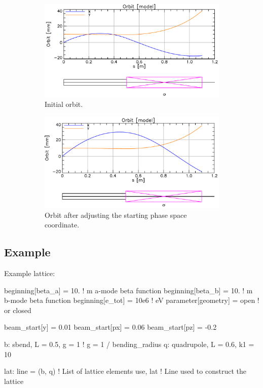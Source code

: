 \documentclass{hitec}
\begin{document}
\begin{figure}[tb]
  \centering
  \begin{subfigure}[b]{0.48\textwidth}
    \includegraphics[width=\textwidth]{phase0.pdf}
    \caption{Initial orbit.}
    \label{f:phase0}
  \end{subfigure}
  \hfil
  \begin{subfigure}[b]{0.48\textwidth}
    \includegraphics[width=\textwidth]{phase1.pdf}
    \caption{Orbit after adjusting the starting  phase space coordinate.}
    \label{f:phase1}
  \end{subfigure}
  \caption{}
\end{figure}

\subsection{Example}

Example lattice:
{\small
\begin{code}
beginning[beta_a] = 10.     ! m  a-mode beta function
beginning[beta_b] = 10.     ! m  b-mode beta function
beginning[e_tot] = 10e6     ! eV
parameter[geometry] = open  ! or closed

beam_start[y] = 0.01
beam_start[px] = 0.06
beam_start[pz] = -0.2

b: sbend, L = 0.5, g = 1    ! g = 1 / bending_radius
q: quadrupole, L = 0.6, k1 = 10

lat: line = (b, q)      ! List of lattice elements
use, lat                ! Line used to construct the lattice
\end{code}}
\end{document}

